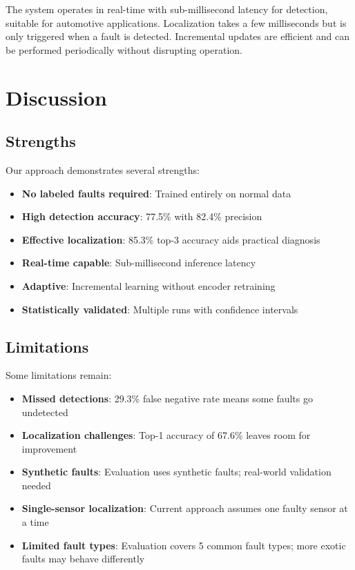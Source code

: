 The system operates in real-time with sub-millisecond latency for detection, suitable for automotive applications. Localization takes a few milliseconds but is only triggered when a fault is detected. Incremental updates are efficient and can be performed periodically without disrupting operation.

\section{Discussion}

\subsection{Strengths}

Our approach demonstrates several strengths:

\begin{itemize}
    \item \textbf{No labeled faults required}: Trained entirely on normal data
    \item \textbf{High detection accuracy}: 77.5\% with 82.4\% precision
    \item \textbf{Effective localization}: 85.3\% top-3 accuracy aids practical diagnosis
    \item \textbf{Real-time capable}: Sub-millisecond inference latency
    \item \textbf{Adaptive}: Incremental learning without encoder retraining
    \item \textbf{Statistically validated}: Multiple runs with confidence intervals
\end{itemize}

\subsection{Limitations}

Some limitations remain:

\begin{itemize}
    \item \textbf{Missed detections}: 29.3\% false negative rate means some faults go undetected
    \item \textbf{Localization challenges}: Top-1 accuracy of 67.6\% leaves room for improvement
    \item \textbf{Synthetic faults}: Evaluation uses synthetic faults; real-world validation needed
    \item \textbf{Single-sensor localization}: Current approach assumes one faulty sensor at a time
    \item \textbf{Limited fault types}: Evaluation covers 5 common fault types; more exotic faults may behave differently
\end{itemize}

